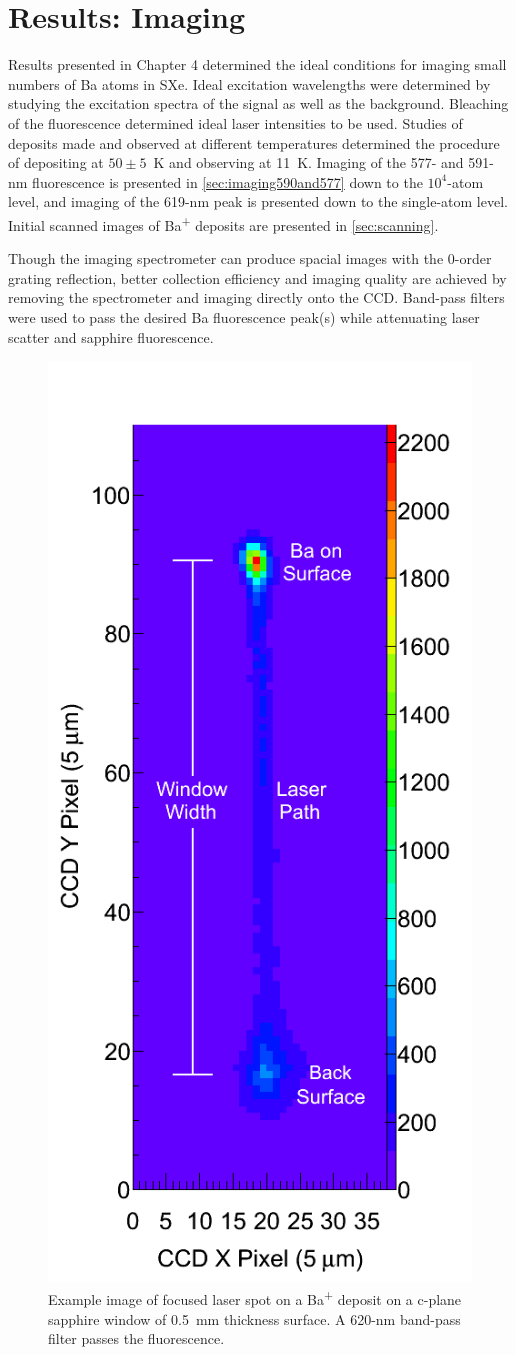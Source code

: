 \chapter{Results: Imaging}
\label{imaging}


Results presented in Chapter 4 determined the ideal conditions for imaging small numbers of Ba atoms in SXe.  Ideal excitation wavelengths were determined by studying the excitation spectra of the signal as well as the background.  Bleaching of the fluorescence determined ideal laser intensities to be used.  Studies of deposits made and observed at different temperatures determined the procedure of depositing at $50 \pm 5$~K and observing at 11~K.  Imaging of the 577- and 591-nm fluorescence is presented in \ref{sec:imaging590and577} down to the $10^{4}$-atom level, and imaging of the 619-nm peak is presented down to the single-atom level.  Initial scanned images of Ba\textsuperscript{+} deposits are presented in \ref{sec:scanning}.

Though the imaging spectrometer can produce spacial images with the 0-order grating reflection, better collection efficiency and imaging quality are achieved by removing the spectrometer and imaging directly onto the CCD.  Band-pass filters were used to pass the desired Ba fluorescence peak(s) while attenuating laser scatter and sapphire fluorescence.

\begin{figure} %
        \centering
                \includegraphics[width=.4\textwidth]{figures/imageExamp.png}
                \caption{Example image of focused laser spot on a Ba\textsuperscript{+} deposit on a c-plane sapphire window of 0.5~mm thickness surface.  A 620-nm band-pass filter passes the fluorescence.}
\label{fig:imageexamp}
\end{figure}

